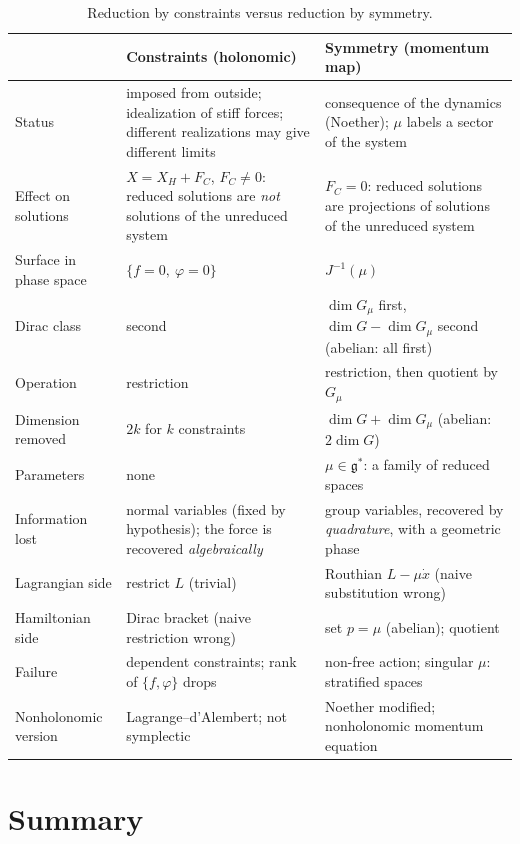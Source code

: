 \begin{table}[ht]
\centering\small
\renewcommand{\arraystretch}{1.25}
\begin{tabular}{p{2.4cm}|p{5.5cm}|p{5.5cm}}
 & \textbf{Constraints (holonomic)} & \textbf{Symmetry (momentum map)}\\ \hline
Status & imposed from outside; idealization of stiff forces; different realizations may give different limits & consequence of the dynamics (Noether); $\mu$ labels a sector of the system\\ \hline
Effect on solutions & $X=X_H+F_C$, $F_C\neq0$: reduced solutions are \emph{not} solutions of the unreduced system & $F_C=0$: reduced solutions are projections of solutions of the unreduced system\\ \hline
Surface in phase space & $\{f=0,\ \varphi=0\}$ & $J^{-1}(\mu)$\\ \hline
Dirac class & second & $\dim G_\mu$ first, $\dim G-\dim G_\mu$ second (abelian: all first)\\ \hline
Operation & restriction & restriction, then quotient by $G_\mu$\\ \hline
Dimension removed & $2k$ for $k$ constraints & $\dim G+\dim G_\mu$ (abelian: $2\dim G$)\\ \hline
Parameters & none & $\mu\in\mathfrak g^*$: a family of reduced spaces\\ \hline
Information lost & normal variables (fixed by hypothesis); the force is recovered \emph{algebraically} & group variables, recovered by \emph{quadrature}, with a geometric phase\\ \hline
Lagrangian side & restrict $L$ (trivial) & Routhian $L-\mu\dot x$ (naive substitution wrong)\\ \hline
Hamiltonian side & Dirac bracket (naive restriction wrong) & set $p=\mu$ (abelian); quotient\\ \hline
Failure & dependent constraints; rank of $\{f,\varphi\}$ drops & non-free action; singular $\mu$: stratified spaces\\ \hline
Nonholonomic version & Lagrange--d'Alembert; not symplectic & Noether modified; nonholonomic momentum equation
\end{tabular}
\caption{Reduction by constraints versus reduction by symmetry.}\label{rd:tab:score}
\end{table}

\section{Summary}\label{rd:sec:summary}

